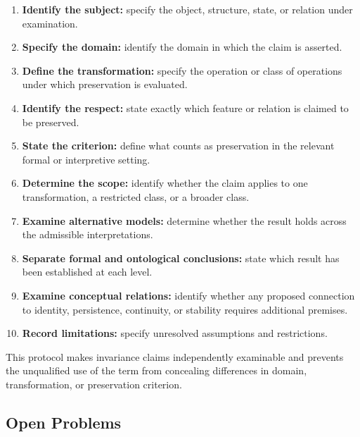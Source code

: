 \begin{enumerate}
    \item \textbf{Identify the subject:} specify
    the object, structure, state, or relation
    under examination.

    \item \textbf{Specify the domain:} identify
    the domain in which the claim is asserted.

    \item \textbf{Define the transformation:}
    specify the operation or class of operations
    under which preservation is evaluated.

    \item \textbf{Identify the respect:} state
    exactly which feature or relation is
    claimed to be preserved.

    \item \textbf{State the criterion:} define
    what counts as preservation in the relevant
    formal or interpretive setting.

    \item \textbf{Determine the scope:} identify
    whether the claim applies to one
    transformation, a restricted class, or
    a broader class.

    \item \textbf{Examine alternative models:}
    determine whether the result holds across
    the admissible interpretations.

    \item \textbf{Separate formal and ontological
    conclusions:} state which result has been
    established at each level.

    \item \textbf{Examine conceptual relations:}
    identify whether any proposed connection
    to identity, persistence, continuity, or
    stability requires additional premises.

    \item \textbf{Record limitations:} specify
    unresolved assumptions and restrictions.
\end{enumerate}

This protocol makes invariance claims
independently examinable and prevents the
unqualified use of the term from concealing
differences in domain, transformation, or
preservation criterion.

\subsection{Open Problems}

